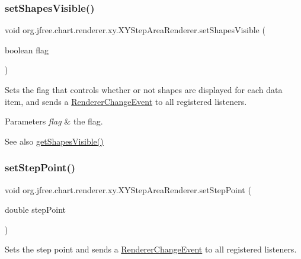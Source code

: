 \subsubsection{\texorpdfstring{set\+Shapes\+Visible()}{setShapesVisible()}}
{\footnotesize\ttfamily void org.\+jfree.\+chart.\+renderer.\+xy.\+X\+Y\+Step\+Area\+Renderer.\+set\+Shapes\+Visible (\begin{DoxyParamCaption}\item[{boolean}]{flag }\end{DoxyParamCaption})}

Sets the flag that controls whether or not shapes are displayed for each data item, and sends a \mbox{\hyperlink{}{Renderer\+Change\+Event}} to all registered listeners.


\begin{DoxyParams}{Parameters}
{\em flag} & the flag.\\
\hline
\end{DoxyParams}
\begin{DoxySeeAlso}{See also}
\mbox{\hyperlink{classorg_1_1jfree_1_1chart_1_1renderer_1_1xy_1_1_x_y_step_area_renderer_a788e4b8ad2e8a0cafbcaace5916ff067}{get\+Shapes\+Visible()}} 
\end{DoxySeeAlso}
\mbox{\label{classorg_1_1jfree_1_1chart_1_1renderer_1_1xy_1_1_x_y_step_area_renderer_a5161326ff2e3dd9c5f43cbd50fbf8410}} 
\subsubsection{\texorpdfstring{set\+Step\+Point()}{setStepPoint()}}
{\footnotesize\ttfamily void org.\+jfree.\+chart.\+renderer.\+xy.\+X\+Y\+Step\+Area\+Renderer.\+set\+Step\+Point (\begin{DoxyParamCaption}\item[{double}]{step\+Point }\end{DoxyParamCaption})}

Sets the step point and sends a \mbox{\hyperlink{}{Renderer\+Change\+Event}} to all registered listeners.


